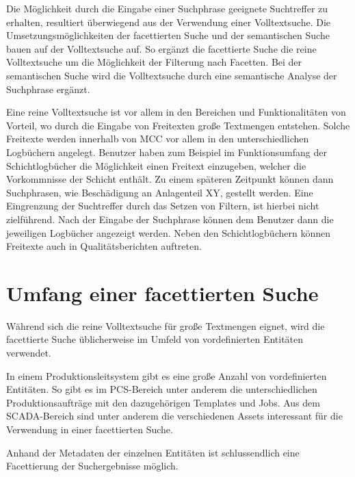 Die Möglichkeit durch die Eingabe einer Suchphrase geeignete Suchtreffer zu erhalten, resultiert überwiegend aus der Verwendung einer Volltextsuche. Die Umsetzungsmöglichkeiten der facettierten Suche und der semantischen Suche bauen auf der Volltextsuche auf. So ergänzt die facettierte Suche die reine Volltextsuche um die Möglichkeit der Filterung nach Facetten. Bei der semantischen Suche wird die Volltextsuche durch eine semantische Analyse der Suchphrase ergänzt.

Eine reine Volltextsuche ist vor allem in den Bereichen und Funktionalitäten von Vorteil, wo durch die Eingabe von Freitexten große Textmengen entstehen. Solche Freitexte werden innerhalb von MCC vor allem in den unterschiedlichen Logbüchern angelegt. Benutzer haben zum Beispiel im Funktionsumfang der Schichtlogbücher die Möglichkeit einen Freitext einzugeben, welcher die Vorkommnisse der Schicht enthält. Zu einem späteren Zeitpunkt können dann Suchphrasen, wie \glqq Beschädigung an Anlagenteil XY\grqq{}, gestellt werden. Eine Eingrenzung der Suchtreffer durch das Setzen von Filtern, ist hierbei nicht zielführend. Nach der Eingabe der Suchphrase können dem Benutzer dann die jeweiligen Logbücher angezeigt werden. Neben den Schichtlogbüchern können Freitexte auch in Qualitätsberichten auftreten.

\section{Umfang einer facettierten Suche\label{sec3.3:Unterpunkt-3}}

Während sich die reine Volltextsuche für große Textmengen eignet, wird die facettierte Suche üblicherweise im Umfeld von vordefinierten Entitäten verwendet.

In einem Produktionsleitsystem gibt es eine große Anzahl von vordefinierten Entitäten. So gibt es im PCS-Bereich unter anderem die unterschiedlichen Produktionsaufträge mit den dazugehörigen Templates und Jobs. Aus dem SCADA-Bereich sind unter anderem die verschiedenen Assets interessant für die Verwendung in einer facettierten Suche.

Anhand der Metadaten der einzelnen Entitäten ist schlussendlich eine Facettierung der Suchergebnisse möglich.


